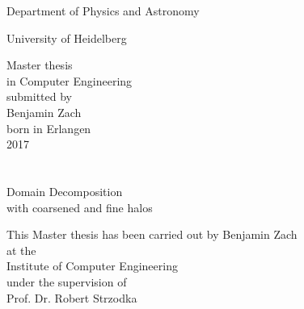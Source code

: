\begin{titlepage}
    \begin{center}
        \vspace*{0.5cm}
        
        \huge{Department of Physics and Astronomy}
        
        \vspace{0.5cm}
	\large
        University of Heidelberg
        
        
        
        \vfill
        \large
        Master thesis \\
	in Computer Engineering \\
	submitted by \\
	Benjamin Zach \\
	born in Erlangen \\
	2017
        
        
    \end{center}

\newpage
\chapter*{}
	\begin{center}
	\vspace*{0.5 cm}
	\huge
	Domain Decomposition \\
	with coarsened and fine halos

	\vfill
	\small
	This Master thesis has been carried out by Benjamin Zach \\
	at the\\
	 Institute of Computer Engineering \\
	under the supervision of \\
	Prof. Dr. Robert Strzodka
	

	\end{center}



\end{titlepage}